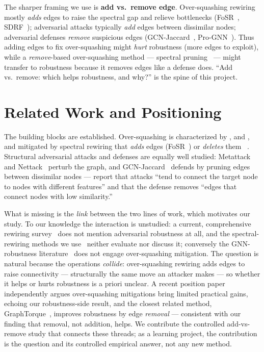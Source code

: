 \documentclass[11pt]{article}
\begin{document}
The sharper framing we use is \textbf{add vs.\ remove edge}. Over-squashing rewiring mostly \emph{adds} edges
to raise the spectral gap and relieve bottlenecks (FoSR~\citep{karhadkar2023fosr},
SDRF~\citep{topping2022understanding}); adversarial attacks typically \emph{add} edges between dissimilar
nodes; adversarial defenses \emph{remove} suspicious edges (GCN-Jaccard~\citep{wu2019jaccard},
Pro-GNN~\citep{jin2020prognn}). Thus adding edges to fix over-squashing might \emph{hurt} robustness (more
edges to exploit), while a \emph{remove}-based over-squashing method --- spectral
pruning~\citep{jamadandi2024spectral} --- might transfer to robustness because it removes edges like a defense
does. ``Add vs.\ remove: which helps robustness, and why?'' is the spine of this project.

\section{Related Work and Positioning}
The building blocks are established. Over-squashing is characterized by \citet{alon2021bottleneck},
\citet{topping2022understanding} and \citet{digiovanni2023oversquashing}, and mitigated by spectral
rewiring that \emph{adds} edges (FoSR~\citep{karhadkar2023fosr}) or \emph{deletes} them
~\citep{jamadandi2024spectral}. Structural adversarial attacks and defenses are equally well studied:
Metattack~\citep{zugner2019metattack} and Nettack~\citep{zugner2018nettack} perturb the graph, and
GCN-Jaccard~\citep{wu2019jaccard} defends by pruning edges between dissimilar nodes --- \citet{wu2019jaccard}
report that attacks ``tend to connect the target node to nodes with different features'' and that the
defense removes ``edges that connect nodes with low similarity.''

What is missing is the \emph{link} between the two lines of work, which motivates our study. To our
knowledge the interaction is unstudied: a current, comprehensive rewiring
survey~\citep{attali2024rewiringsurvey} does not mention adversarial robustness at all, and the
spectral-rewiring methods we use~\citep{karhadkar2023fosr, jamadandi2024spectral} neither evaluate nor
discuss it; conversely the GNN-robustness literature~\citep{wu2019jaccard, foth2025gtrobust} does not
engage over-squashing mitigation. The question is natural because the operations \emph{collide}:
over-squashing rewiring adds edges to raise connectivity --- structurally the same move an attacker makes
--- so whether it helps or hurts robustness is a priori unclear. A recent position
paper~\citep{kormann2026position} independently argues over-squashing mitigations bring limited practical
gains, echoing our robustness-side result, and the closest related method,
GraphTorque~\citep{huang2025graphtorque}, improves robustness by edge \emph{removal} --- consistent with
our finding that removal, not addition, helps. We contribute the controlled add-vs-remove study that
connects these threads; as a learning project, the contribution is the question and its controlled
empirical answer, not any new method.
\end{document}
